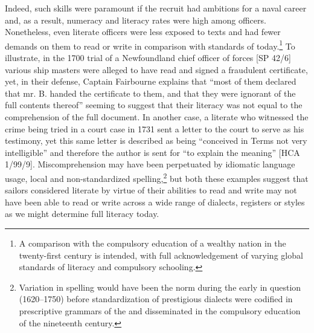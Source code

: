 Indeed, such skills were paramount if the recruit had ambitions for a naval career and, as a result, numeracy and literacy rates were high among officers. Nonetheless, even literate officers were less exposed to texts and had fewer demands on them to read or write in comparison with standards of today.\footnote{A comparison with the compulsory education of a wealthy nation in the twenty-first century is intended, with full acknowledgement of varying global standards of literacy and compulsory schooling.} To illustrate, in the 1700 trial of a Newfoundland chief officer of forces [SP 42/6] various ship masters were alleged to have read and signed a fraudulent certificate, yet, in their defense, Captain Fairbourne explains that “most of them declared that mr. B. handed the certificate to them, and that they were ignorant of the full contents thereof” seeming to suggest that their literacy was not equal to the comprehension of the full document. In another case, a literate  who witnessed the crime being tried in a court case in 1731 sent a letter to the court to serve as his testimony, yet this same letter is described as being “conceived in Terms not very intelligible” and therefore the author is sent for “to explain the meaning” [HCA 1/99/9]. Miscomprehension may have been perpetuated by idiomatic language usage, local  and non-standardized spelling,\footnote{Variation in spelling would have been the norm during the early  in question (1620–1750) before standardization of prestigious dialects were codified in prescriptive grammars of the  and disseminated in the compulsory education of the nineteenth century.} but both these examples suggest that sailors considered literate by virtue of their abilities to read and write may not have been able to read or write across a wide range of dialects, registers or styles as we might determine full literacy today.  

